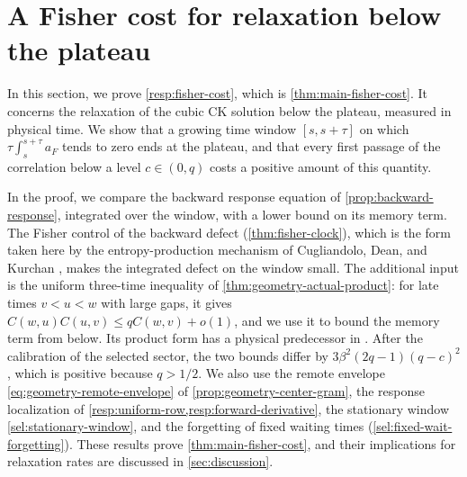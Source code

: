 \chapter{A Fisher cost for relaxation below the plateau}\label{resp:fisher-chapter}

In this section, we prove \cref{resp:fisher-cost}, which is \cref{thm:main-fisher-cost}. It concerns the relaxation of the cubic CK solution below the plateau, measured in physical time. We show that a growing time window $[s,s+\tau]$ on which $\tau\int_s^{s+\tau}a_F$ tends to zero ends at the plateau, and that every first passage of the correlation below a level $c\in(0,q)$ costs a positive amount of this quantity.

In the proof, we compare the backward response equation of \cref{prop:backward-response}, integrated over the window, with a lower bound on its memory term. The Fisher control of the backward defect (\cref{thm:fisher-clock}), which is the form taken here by the entropy-production mechanism of Cugliandolo, Dean, and Kurchan \cite[arXiv version~2, Equations~(12)--(13), p.~3, and Equation~(18), p.~4]{cdk1997}, makes the integrated defect on the window small. The additional input is the uniform three-time inequality of \cref{thm:geometry-actual-product}: for late times $v<u<w$ with large gaps, it gives $C(w,u)C(u,v)\le qC(w,v)+o(1)$, and we use it to bound the memory term from below. Its product form has a physical predecessor in \cite[arXiv version~1, Section~5.1, Equation~(5.1.8)]{ck1994}. After the calibration of the selected sector, the two bounds differ by $3\beta^2(2q-1)(q-c)^2$, which is positive because $q>1/2$. We also use the remote envelope \eqref{eq:geometry-remote-envelope} of \cref{prop:geometry-center-gram}, the response localization of \cref{resp:uniform-row,resp:forward-derivative}, the stationary window \eqref{sel:stationary-window}, and the forgetting of fixed waiting times (\cref{sel:fixed-wait-forgetting}). These results prove \cref{thm:main-fisher-cost}, and their implications for relaxation rates are discussed in \cref{sec:discussion}.

